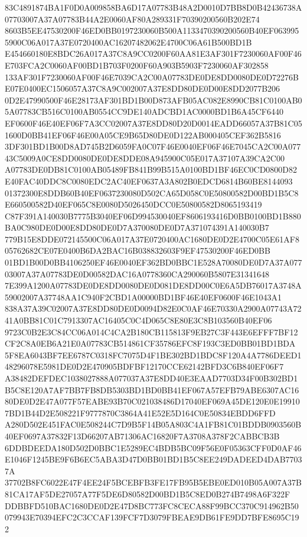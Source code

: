 \documentclass[UTF8,fontset=fandol,zihao=-4,a4paper]{ctexart}
\begin{document}
{{83C4891874BA1F0D0A009858BA6D17A07783B48A2D0010D7BB8D0B42436738A07703007A37A07783B44A2E0060AF80A289331F70390200560B202E74
8603B5EE47530200F46ED0BB0197230060B500A1133470390200560B40EF0639955900C06A017A37E0720400AC16207482062E4700C06A61B500BD1B
E454660180E8BDC26A017A37C8A9CC0200F60AA81E3AF301F7230060AF00F46E703FCA2C0060AF00BD1B703F0200F60A903B5903F7230060AF302858
133AF301F7230060AF00F46E7039CA2C00A07783DE0DE8DD0080DE0D72276BE07E0400EC1506057A37C8A9C002007A37E8DD80DE0D00E8DD2077B206
0D2E47990500F46E28173AF301BD1B00D873AFB05AC082E8990CB81C0100AB05A07783CB516C0100AB0554CC9DE140ADCBD1AC0000BD1B6A45CF6440
EF0600F46E40EF06F7A3CC02007A37E8DD80D20D0014EADD66057A37B81C051600D0BB41EF06F46E00A05CE9B65D80DE0D122AB000405CEF362B5816
3DF301BD1B00D8AD745B2D6059FA0C07F46E0040EF06F46E7045CA2C00A07743C5009A0CE8DD0080DE0DE8DDE08A945900C05E017A37107A39CA2C00
A07783DE0DB81C0100AB05489FB841B99B515A0100BD1BF46EC0CD0800D82E40FAC40DDC8C0080EDC2AC40EF0637A3A802B0EDCD6814B60BE8144093
01372300E8DDB60B40EF0637230080D502CA65D058C0E50800582D00BD1B5C8E660500582D40EF065C8E0080D5026450DCC0E50800582D8065193419
C87F391A140030B7775B3040EF06D994530040EF8606193416D0BB0100BD1B880BA0C980DE0D00E8DD80DE0D7A370080DE0D7A371074391A140030B7
779B15E8DDE072145500C06A017A37E0720400AC1680DE0D2E4700C05E61AF805762682CE07E0400B6DA2BAC16B038832603F9EF47530200F46ED0BB
01BD1B00D0BB4106250EF46E0040EF362BD0BBC1E528A70080DE0D7A37A07703007A37A07783DE0D00582DAC16A0778360CA290060B5807E31341648
7E399A1200A07783DE0DE8DD0080DE0D081DE8DD00C0E6A5DB76017A3748A59002007A37748AA1C940F2CBD1A00000BD1BF46E40EF0600F46E1043A1
838A37A39C02007A37E8DD80DE0D0094D82E0C0AF46E70330A2900A07743A7241A0BB81C01C7913307AC16405C0C4D065C8E80E3C8B103560B40EF06
9723C0B2E3C84CC06A014C4CA2B180CB115813F9EB27C3F443E6EFFF7BF12CF2C8A0EB6A21E0A07783CB514861CF35786EFC8F193C3ED0BB01BD1BDA
5F8EA6043BF7EE6787C0318FC7075D4F1BE302BD1BDC8F120A4A7786DEED148296078E5981DE0D2E470905BDFBF12170CCE62142BFD3C6B840EF06F7
A38482DEFDEC1038027888A077037A37E8DD40E3EAAD7703D34F00B302BD1B5C8E120A7AF7BB7FB8DB5303BD1BD0BB41EF067A57EFB79ABE6307AC16
80DE0D2E47A077F57EABE93B70C021038486D17040EF069A45DE120E0E199107BD1B44D2E508221F9777870C3864A41E52E5D164C0E50834EBDD6FFD
A280D502E451FAC0E508244C7D9B5F14B05A803C4A1FB81C01BDDB0903560B40EF0697A37832F13D66207AB71306AC16820F7A3708A378F2CABBCB3B
6DDBDEEDA180D502D0BBC1E5289EC4BDB5BC09F56E0F05363CFF0D0AF46E1046F1245BE9F6B6EC5ABA3D47D0BB01BD1B5C8EE249DADEED4DAB77037A
37702B8FC6022E47F4EE24F5BCEBFB3FE17FB95B5EBE0ED010B05A007A37B81CA17AF5DE27057A77F5DE6D80582D00BD1B5C8ED0B274B7498A6F322F
DDBBFD510BAC1680DE0D2E47D8BC773FC8CECA88F99BCC370C914962B50079943E70394EFC2C3CCAF139FCF7D3079FBEAE9DB61FE9DD7BFE8695C192
}}
\end{document}
